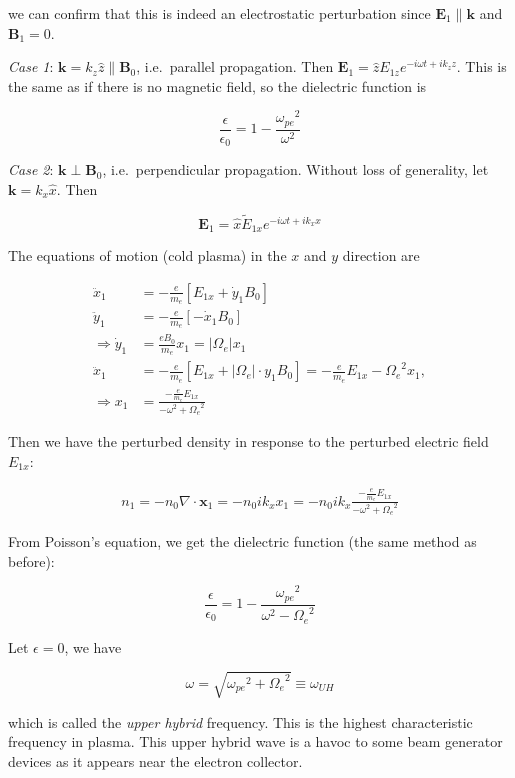 \documentclass[
  notoc %
]{tufte-book}
\begin{document}
we can confirm that this is indeed an electrostatic perturbation since
\(\mathbf{E}_1\parallel \mathbf{k}\) and \(\mathbf{B}_1=0\).

\emph{Case 1}: \(\mathbf{k}=k_z\widehat{z}\parallel \mathbf{B}_0\),
i.e.~parallel propagation. Then
\(\mathbf{E}_1=\widehat{z}E_{1z}e^{-i\omega t+ik_z z}\). This is the
same as if there is no magnetic field, so the dielectric function is

\[
\frac{\epsilon}{\epsilon_0}=1-\frac{{\omega_{pe}}^2}{\omega^2}
\]

\emph{Case 2}: \(\mathbf{k}\perp \mathbf{B}_0\), i.e.~perpendicular
propagation. Without loss of generality, let
\(\mathbf{k}=k_x\widehat{x}\). Then

\[
\mathbf{E}_1=\widehat{x}\tilde{E}_{1x}e^{-i\omega t+ik_x x}
\]

The equations of motion (cold plasma) in the \(x\) and \(y\) direction
are

\[
\begin{aligned}
\ddot{x}_1 &= -\frac{e}{m_e}[E_{1x}+\dot{y}_1B_0] \\
\ddot{y}_1 &= -\frac{e}{m_e}[-\dot{x}_1B_0] \\
\Rightarrow \dot{y}_1&=\frac{eB_0}{m_e}x_1=|\Omega_e| x_1  \\
\ddot{x}_1&=-\frac{e}{m_e}[E_{1x}+|\Omega_e|\cdot{y_1}B_0]=-\frac{e}{m_e}E_{1x}-{\Omega_e}^2 x_1,  \\
\Rightarrow x_1&=\frac{-\frac{e}{m_e}E_{1x}}{-\omega^2+{\Omega_e}^2}
\end{aligned}
\]

Then we have the perturbed density in response to the perturbed electric
field \(E_{1x}\):

\[
\begin{aligned}
n_1=-n_0\nabla\cdot\mathbf{x}_1=-n_0ik_x x_1=-n_0ik_x\frac{-\frac{e}{m_e}E_{1x}}{-\omega^2+{\Omega_e}^2}
\end{aligned}
\]

From Poisson's equation, we get the dielectric function (the same method
as before):

\[
\frac{\epsilon}{\epsilon_0}=1-\frac{{\omega_{pe}}^2}{\omega^2-{\Omega_e}^2}
\]

Let \(\epsilon=0\), we have

\[
\omega=\sqrt{{\omega_{pe}}^2+{\Omega_e}^2}\equiv \omega_{UH}
\]

which is called the \emph{upper hybrid} frequency. This is the highest
characteristic frequency in plasma. This upper hybrid wave is a havoc to
some beam generator devices as it appears near the electron collector.
\end{document}
